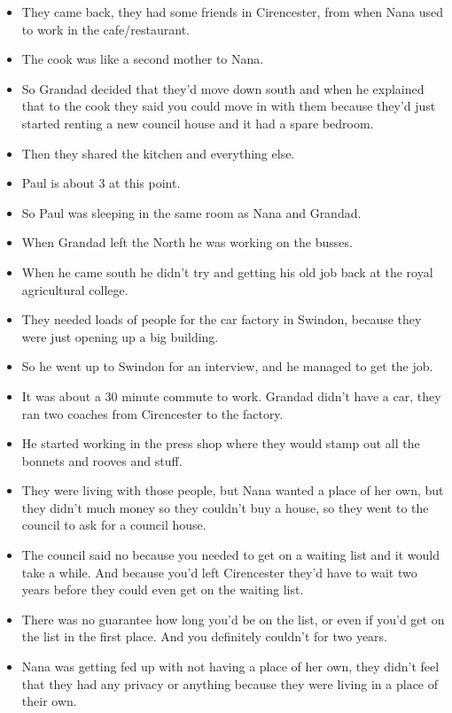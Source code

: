 \documentclass[10pt,twocolumn,letterpaper]{article}
\begin{document}
\begin{itemize}
    \item They came back, they had some friends in Cirencester, from when Nana used to work in the cafe/restaurant.
    \item The cook was like a second mother to Nana.
    \item So Grandad decided that they'd move down south and when he explained that to the cook they said you could move in with them because they'd just started renting a new council house and it had a spare bedroom.
    \item Then they shared the kitchen and everything else.
    \item Paul is about 3 at this point.
    \item So Paul was sleeping in the same room as Nana and Grandad.
    \item When Grandad left the North he was working on the busses.
    \item When he came south he didn't try and getting his old job back at the royal agricultural college.
    \item They needed loads of people for the car factory in Swindon, because they were just opening up a big building.
    \item So he went up to Swindon for an interview, and he managed to get the job.
    \item It was about a 30 minute commute to work. Grandad didn't have a car, they ran two coaches from Cirencester to the factory.
    \item He started working in the press shop where they would stamp out all the bonnets and rooves and stuff.
    \item They were living with those people, but Nana wanted a place of her own, but they didn't much money so they couldn't buy a house, so they went to the council to ask for a council house.
    \item The council said no because you needed to get on a waiting list and it would take a while. And because you'd left Cirencester they'd have to wait two years before they could even get on the waiting list.
    \item There was no guarantee how long you'd be on the list, or even if you'd get on the list in the first place. And you definitely couldn't for two years.
    \item Nana was getting fed up with not having a place of her own, they didn't feel that they had any privacy or anything because they were living in a place of their own.

\end{itemize}
\end{document}
